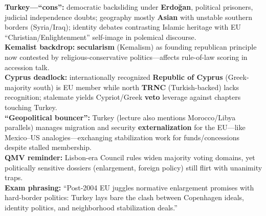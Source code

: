 \documentclass[10pt,a4paper]{article}
\begin{document}
{\textbf{Turkey---``cons'':} democratic backsliding under \textbf{Erdoğan}, political prisoners, judicial independence doubts; geography mostly \textbf{Asian} with unstable southern borders (Syria/Iraq); identity debates contrasting Islamic heritage with EU ``Christian/Enlightenment'' self-image in polemical discourse.\\
\textbf{Kemalist backdrop:} \textbf{secularism} (Kemalism) as founding republican principle now contested by religious-conservative politics---affects rule-of-law scoring in accession talk.\\
\textbf{Cyprus deadlock:} internationally recognized \textbf{Republic of Cyprus} (Greek-majority south) is EU member while north \textbf{TRNC} (Turkish-backed) lacks recognition; stalemate yields Cypriot/Greek \textbf{veto} leverage against chapters touching Turkey.\\
\textbf{``Geopolitical bouncer'':} Turkey (lecture also mentions Morocco/Libya parallels) manages migration and security \textbf{externalization} for the EU---like Mexico--US analogies---exchanging stabilization work for funds/concessions despite stalled membership.\\
\textbf{QMV reminder:} Lisbon-era Council rules widen majority voting domains, yet politically sensitive dossiers (enlargement, foreign policy) still flirt with unanimity traps.\\
\textbf{Exam phrasing:} ``Post-2004 EU juggles normative enlargement promises with hard-border politics: Turkey lays bare the clash between Copenhagen ideals, identity politics, and neighborhood stabilization deals.''
}
\end{document}
